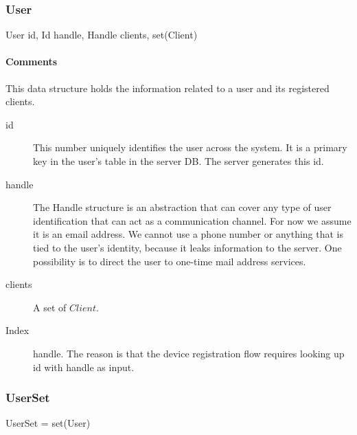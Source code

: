 \documentclass[a4paper,10pt]{article}
\begin{document}
\subsubsection{User}
\label{sec:structure:server:user}

\begin{verbbox}
User
{
  id, Id
  handle, Handle
  clients, set(Client)
}
\end{verbbox}
\begin{center}
\theverbbox
\end{center}

\begin{inparaitem}[ ]
 \item \infrastructure
\end{inparaitem}

\paragraph*{Comments}
This data structure holds the information related to a user and its registered clients.

\SpecialItem
\begin{description}
 \item[id] This number uniquely identifies the user across the system. It is a primary key in the user's table in the server DB. The server generates this id.
 \item[handle] The Handle structure is an abstraction that can cover any type of user identification that can act as a communication channel. For now we assume it is an email 
address. We cannot use a phone number or anything that is tied to the user's identity, because it leaks information to the server. One possibility is to direct the user to 
one-time mail address services.
 \item[clients] A set of $Client$.
\end{description}

\SpecialItem
\begin{description}
 \item[Index] handle. The reason is that the device registration flow requires looking up id with handle as input.
\end{description}

\subsubsection{UserSet}

\begin{verbbox}
UserSet = set(User)
\end{verbbox}
\begin{center}
\theverbbox
\end{center}
\end{document}
